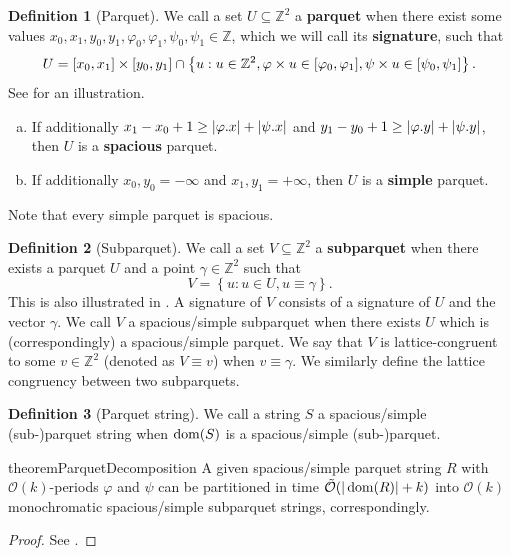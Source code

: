 \documentclass[11pt]{article}
\newcommand{\Z}{\mathbb{Z}}
\renewcommand{\O}{\mathcal{O}}
\newcommand{\tO}{\tilde{\mathcal{O}}}
\renewcommand{\phi}{\varphi}
\newcommand{\set}[1]{\left\lbrace #1 \right\rbrace}
\theoremstyle{plain}
\theoremstyle{definition}
\newtheorem{definition}{Definition}
\theoremstyle{remark}
\begin{document}
\begin{definition}[Parquet]\label{parquet_definition}
	We call a set $U \subseteq \Z^2$ a \textbf{parquet} when there exist some values $x_0, x_1, y_0, y_1, \phi_0, \phi_1, \psi_0, \psi_1 \in \Z$, which we will call its \textbf{signature}, such that
	\[ U = [x_0, x_1] \times [y_0, y_1] \cap \set{u : u \in \Z^2, \h{u} \in [\phi_0, \phi_1], \s{u} \in [\psi_0, \psi_1]}. \]
	See  for an illustration.
	\begin{enumerate}[a)]
		\item If additionally $x_1 - x_0 + 1 \ge |\x{\phi}| + |\x{\psi}|$ and $y_1 - y_0 + 1 \ge |\y{\phi}| + |\y{\psi}|$, then $U$ is a \textbf{spacious} parquet.
		\item If additionally $x_0, y_0 = -\infty$ and $x_1, y_1 = +\infty$, then $U$ is a \textbf{simple} parquet.
	\end{enumerate}
	Note that every simple parquet is spacious.
\end{definition}


\begin{definition}[Subparquet]\label{subparquet_definition}
	We call a set $V \subseteq \Z^2$ a \textbf{subparquet} when there exists a parquet $U$ and a point $\gamma \in \Z^2$ such that
	\[ V = \set{u : u \in U, u \equiv \gamma}.\]
	This is also illustrated in .
	A signature of $V$ consists of a signature of $U$ and the vector $\gamma$.
	We call $V$ a spacious/simple subparquet when there exists $U$ which is (correspondingly) a spacious/simple parquet.
	We say that $V$ is lattice-congruent to some $v \in \Z^2$ (denoted as $V \equiv v$) when $v \equiv \gamma$.
	We similarly define the lattice congruency between two subparquets.
\end{definition}


\begin{definition}[Parquet string]\label{parquet_string_definition}
	We call a string $S$ a spacious/simple (sub-)parquet string when $\operatorname*{dom}(S)$ is a spacious/simple (sub-)parquet.
\end{definition}


\begin{restatable*}{theorem}{ParquetDecomposition}\label{parquet_decomposition}
	A given spacious/simple parquet string $R$ with $\O(k)$-periods $\phi$ and $\psi$ can be partitioned in time $\tO(|\d{R}| + k)$ into $\O(k)$ monochromatic spacious/simple subparquet strings, correspondingly.
\end{restatable*}
\begin{proof} See . \end{proof}
\end{document}

